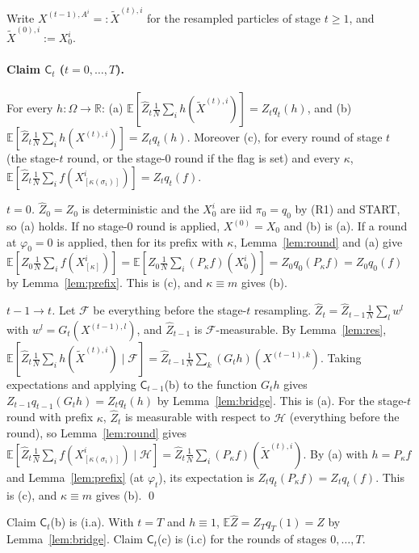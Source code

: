 \documentclass[11pt]{article}
\theoremstyle{remark}
\newcommand{\E}{\mathbb{E}}
\newcommand{\R}{\mathbb{R}}
\newcommand{\cF}{\mathcal{F}}
\newcommand{\cH}{\mathcal{H}}
\newcommand{\Zh}{\widehat Z}
\newcommand{\Om}{\Omega}
\begin{document}
Write $X^{(t-1),A^i}=:\tilde X^{(t),i}$ for the resampled particles of stage $t\ge1$, and $\tilde X^{(0),i}:=X_0^i$.

\paragraph{Claim $\mathsf C_t$ ($t=0,\dots,T$).} For every $h:\Om\to\R$: (a) $\E[\Zh_t\frac1N\sum_ih(\tilde X^{(t),i})]=Z_tq_t(h)$, and (b) $\E[\Zh_t\frac1N\sum_ih(X^{(t),i})]=Z_tq_t(h)$. Moreover (c), for every round of stage $t$ (the stage-$t$ round, or the stage-0 round if the flag is set) and every $\kappa$, $\E[\Zh_t\frac1N\sum_i f(X^i_{[\kappa(\sigma_i)]})]=Z_tq_t(f)$.

\emph{$t=0$.} $\Zh_0=Z_0$ is deterministic and the $X_0^i$ are iid $\pi_0=q_0$ by (R1) and START, so (a) holds. If no stage-0 round is applied, $X^{(0)}=X_0$ and (b) is (a). If a round at $\varphi_0=0$ is applied, then for its prefix with $\kappa$, Lemma~\ref{lem:round} and (a) give $\E[Z_0\frac1N\sum_if(X^i_{[\kappa]})]=\E[Z_0\frac1N\sum_i(P_\kappa f)(X_0^i)]=Z_0q_0(P_\kappa f)=Z_0q_0(f)$ by Lemma~\ref{lem:prefix}. This is (c), and $\kappa\equiv m$ gives (b).

\emph{$t-1\to t$.} Let $\cF$ be everything before the stage-$t$ resampling. $\Zh_t=\Zh_{t-1}\frac1N\sum_lw^l$ with $w^l=G_t(X^{(t-1),l})$, and $\Zh_{t-1}$ is $\cF$-measurable. By Lemma~\ref{lem:res},
$\E[\Zh_t\frac1N\sum_ih(\tilde X^{(t),i})\mid\cF]=\Zh_{t-1}\frac1N\sum_k(G_th)(X^{(t-1),k})$.
Taking expectations and applying $\mathsf C_{t-1}$(b) to the function $G_th$ gives $Z_{t-1}q_{t-1}(G_th)=Z_tq_t(h)$ by Lemma~\ref{lem:bridge}. This is (a). For the stage-$t$ round with prefix $\kappa$, $\Zh_t$ is measurable with respect to $\cH$ (everything before the round), so Lemma~\ref{lem:round} gives
$\E[\Zh_t\frac1N\sum_if(X^i_{[\kappa(\sigma_i)]})\mid\cH]=\Zh_t\frac1N\sum_i(P_\kappa f)(\tilde X^{(t),i})$.
By (a) with $h=P_\kappa f$ and Lemma~\ref{lem:prefix} (at $\varphi_t$), its expectation is $Z_tq_t(P_\kappa f)=Z_tq_t(f)$. This is (c), and $\kappa\equiv m$ gives (b). \qed

Claim $\mathsf C_t$(b) is (i.a). With $t=T$ and $h\equiv1$, $\E\Zh=Z_Tq_T(1)=Z$ by Lemma~\ref{lem:bridge}. Claim $\mathsf C_t$(c) is (i.c) for the rounds of stages $0,\dots,T$.
\end{document}
